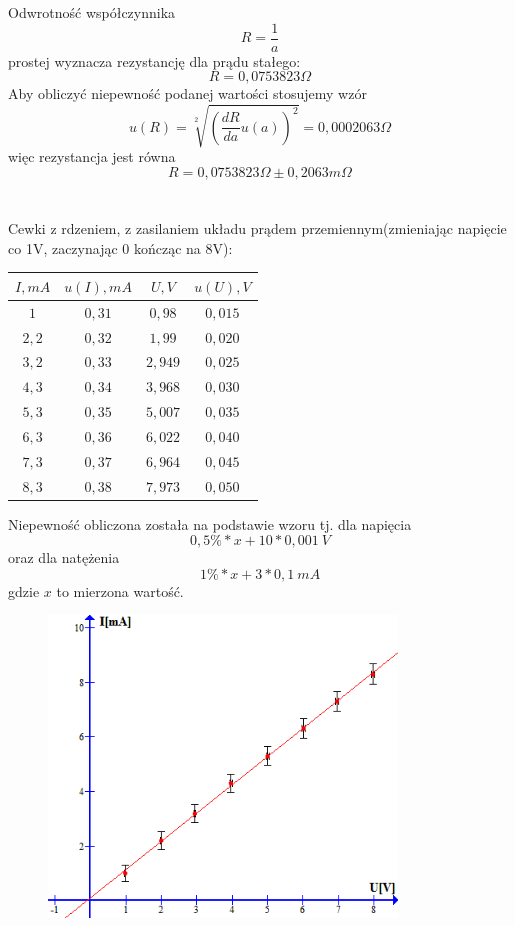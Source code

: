 \documentclass{article}
\begin{document}
Odwrotność współczynnika 
$$R = \frac{1}{a}$$
prostej wyznacza rezystancję dla prądu stałego:
$$R = 0,0753823 \Omega$$ 
Aby obliczyć niepewność podanej wartości stosujemy wzór
$$u(R) = \sqrt[2]{(\frac{dR}{da}u(a))^2} = 0,0002063 \Omega$$
więc rezystancja jest równa
$$R = 0,0753823 \Omega \pm 0,2063 m \Omega$$
\\\\
Cewki z rdzeniem, z zasilaniem układu prądem przemiennym(zmieniając napięcie co 1V, zaczynając 0 kończąc na 8V):
\begin{center}
    \begin{tabular}{|c|c|c|c|}
    \hline
$I,mA$ & $u(I), mA$ & $U,V$ & $u(U), V$\\ \hline
$1$ & $0,31$ & $0,98$ & $0,015$\\ \hline
$2,2$ & $0,32$ & $1,99$ & $0,020$\\ \hline
$3,2$ & $0,33$ & $2,949$ & $0,025$\\ \hline
$4,3$ & $0,34$ & $3,968$ & $0,030$\\ \hline
$5,3$ & $0,35$ & $5,007$ & $0,035$\\ \hline
$6,3$ & $0,36$ & $6,022$ & $0,040$\\ \hline
$7,3$ & $0,37$ & $6,964$ & $0,045$\\ \hline
$8,3$ & $0,38$ & $7,973$ & $0,050$\\ \hline
    \end{tabular}
\end{center}
Niepewność obliczona została na podstawie wzoru tj. dla napięcia
$$0,5\% * x + 10 * 0,001\ V $$
oraz dla natężenia
$$1\% * x + 3 * 0,1\ mA$$
gdzie $x$ to mierzona wartość.
\begin{figure}[ht]
\centering
\includegraphics[height=8cm]{wykres_2.png}
\end{figure}\\
\end{document}

